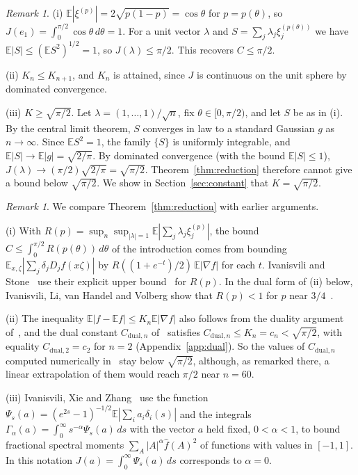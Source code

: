 \documentclass[11pt]{amsart}
\theoremstyle{remark}
\newtheorem{remark}[theorem]{Remark}
\numberwithin{equation}{section}
\newcommand{\E}{\mathbb{E}}
\begin{document}
\begin{remark}\label{rem:basic}
(i) $\E|\xi^{(p)}|=2\sqrt{p(1-p)}=\cos\theta$ for $p=p(\theta)$, so $J(e_1)=\int_0^{\pi/2}\cos\theta\,d\theta=1$. For a unit vector $\lambda$ and $S=\sum_j\lambda_j\xi_j^{(p(\theta))}$ we have $\E|S|\le(\E S^2)^{1/2}=1$, so $J(\lambda)\le\pi/2$. This recovers $C\le\pi/2$.

(ii) $K_n\le K_{n+1}$, and $K_n$ is attained, since $J$ is continuous on the unit sphere by dominated convergence.

(iii) $K\ge\sqrt{\pi/2}$. Let $\lambda=(1,\dots,1)/\sqrt n$, fix $\theta\in[0,\pi/2)$, and let $S$ be as in (i). By the central limit theorem, $S$ converges in law to a standard Gaussian $g$ as $n\to\infty$. Since $\E S^2=1$, the family $\{S\}$ is uniformly integrable, and $\E|S|\to\E|g|=\sqrt{2/\pi}$. By dominated convergence (with the bound $\E|S|\le1$), $J(\lambda)\to(\pi/2)\sqrt{2/\pi}=\sqrt{\pi/2}$. Theorem~\ref{thm:reduction} therefore cannot give a bound below $\sqrt{\pi/2}$. We show in Section~\ref{sec:constant} that $K=\sqrt{\pi/2}$.
\end{remark}

\begin{remark}\label{rem:dual}
We compare Theorem~\ref{thm:reduction} with earlier arguments.

(i) With $R(p)=\sup_n\sup_{|\lambda|=1}\E|\sum_j\lambda_j\xi_j^{(p)}|$, the bound $C\le\int_0^{\pi/2}R(p(\theta))\,d\theta$ of the introduction comes from bounding $\E_{x,\zeta}|\sum_j\delta_jD_jf(x\zeta)|$ by $R((1+e^{-t})/2)\,\E|\nabla f|$ for each $t$. Ivanisvili and Stone~\cite[Section~2.4]{IS24} use their explicit upper bound~\cite[(1.8)]{IS24} for $R(p)$. In the dual form of (ii) below, Ivanisvili, Li, van Handel and Volberg show that $R(p)<1$ for $p$ near $3/4$~\cite[Theorem~3.1]{ILvHV}.

(ii) The inequality $\E|f-\E f|\le K_n\E|\nabla f|$ also follows from the duality argument of~\cite[Section~2]{ILvHV}, and the dual constant $C_{\mathrm{dual},n}$ of~\cite[(12.1)]{ILvHV} satisfies $C_{\mathrm{dual},n}\le K_n=c_n<\sqrt{\pi/2}$, with equality $C_{\mathrm{dual},2}=c_2$ for $n=2$ (Appendix~\ref{app:dual}). So the values of $C_{\mathrm{dual},n}$ computed numerically in~\cite[Section~12]{ILvHV} stay below $\sqrt{\pi/2}$, although, as remarked there, a linear extrapolation of them would reach $\pi/2$ near $n=60$.

(iii) Ivanisvili, Xie and Zhang~\cite[Section~6]{IXZ26} use the function $\Psi_s(a)=(e^{2s}-1)^{-1/2}\E|\sum_ia_i\delta_i(s)|$ and the integrals $\Gamma_\alpha(a)=\int_0^\infty s^{-\alpha}\Psi_s(a)\,ds$ with the vector $a$ held fixed, $0<\alpha<1$, to bound fractional spectral moments $\sum_A|A|^\alpha\hat f(A)^2$ of functions with values in $[-1,1]$. In this notation $J(a)=\int_0^\infty\Psi_s(a)\,ds$ corresponds to $\alpha=0$.
\end{remark}
\end{document}
